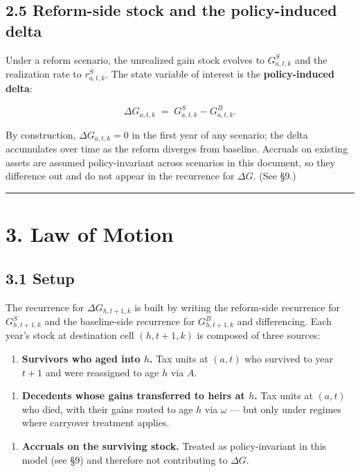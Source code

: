 \documentclass[11pt]{article}
\begin{document}
\subsection*{2.5 Reform-side stock and the policy-induced delta}

Under a reform scenario, the unrealized gain stock evolves to $G^S_{a,t,k}$ and the realization rate to $r^S_{a,t,k}$. The state variable of interest is the \textbf{policy-induced delta}:

\[
\Delta G_{a,t,k} \;=\; G^S_{a,t,k} - G^B_{a,t,k}.
\]

By construction, $\Delta G_{a,t,k} = 0$ in the first year of any scenario; the delta accumulates over time as the reform diverges from baseline. Accruals on existing assets are assumed policy-invariant across scenarios in this document, so they difference out and do not appear in the recurrence for $\Delta G$. (See §9.)

\par\medskip\hrule\medskip

\section*{3. Law of Motion}

\subsection*{3.1 Setup}

The recurrence for $\Delta G_{h, t+1, k}$ is built by writing the reform-side recurrence for $G^S_{h, t+1, k}$ and the baseline-side recurrence for $G^B_{h, t+1, k}$ and differencing. Each year's stock at destination cell $(h, t+1, k)$ is composed of three sources:

\begin{enumerate}
  \item \textbf{Survivors who aged into $h$.} Tax units at $(a, t)$ who survived to
    year $t+1$ and were reassigned to age $h$ via $A$.
\end{enumerate}
\begin{enumerate}
  \item \textbf{Decedents whose gains transferred to heirs at $h$.} Tax units at
    $(a, t)$ who died, with their gains routed to age $h$ via $\omega$ — but
    only under regimes where carryover treatment applies.
\end{enumerate}
\begin{enumerate}
  \item \textbf{Accruals on the surviving stock.} Treated as policy-invariant in this
    model (see §9) and therefore not contributing to $\Delta G$.
\end{enumerate}
\end{document}

